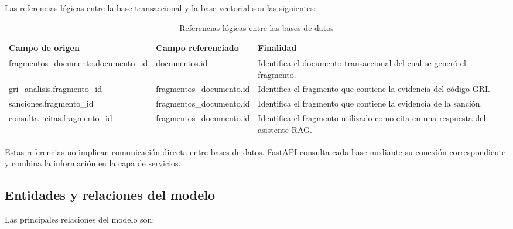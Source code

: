Las referencias lógicas entre la base transaccional y la base vectorial
son las siguientes:

\begin{table}[H]
\centering
\caption{Referencias lógicas entre las bases de datos}
\label{tab:referencias-logicas}
\renewcommand{\arraystretch}{1.35}
\footnotesize
\newcommand{\bk}{\allowbreak}
\begin{tabularx}{\textwidth}{
    >{\raggedright\arraybackslash}p{3.6cm}
    >{\raggedright\arraybackslash}p{3.4cm}
    >{\raggedright\arraybackslash}X
}
\toprule
\textbf{Campo de origen} &
\textbf{Campo referenciado} &
\textbf{Finalidad}
\\
\midrule

fragmentos\_\bk documento.\bk documento\_id
&
documentos.id
&
Identifica el documento transaccional del cual se generó el fragmento.
\\

gri\_\bk analisis.\bk fragmento\_id
&
fragmentos\_\bk documento.id
&
Identifica el fragmento que contiene la evidencia del código GRI.
\\

sanciones.\bk fragmento\_id
&
fragmentos\_\bk documento.id
&
Identifica el fragmento que contiene la evidencia de la sanción.
\\

consulta\_\bk citas.\bk fragmento\_id
&
fragmentos\_\bk documento.id
&
Identifica el fragmento utilizado como cita en una respuesta del
asistente RAG.
\\

\bottomrule
\end{tabularx}
\end{table}

Estas referencias no implican comunicación directa entre bases de datos.
FastAPI consulta cada base mediante su conexión correspondiente y combina
la información en la capa de servicios.



\subsection{Entidades y relaciones del modelo}

Las principales relaciones del modelo son:

